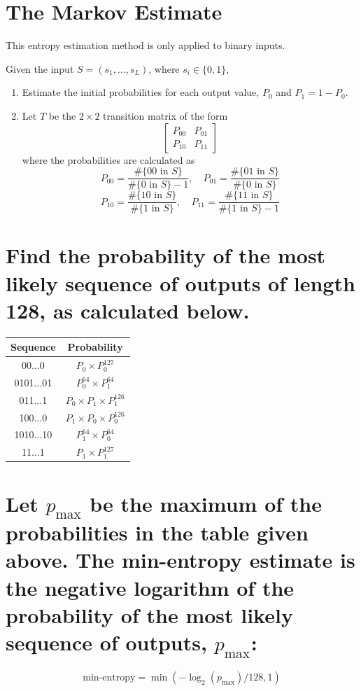 \documentclass[12pt,openany]{book}
\theoremstyle{definition}
\begin{document}
\section*{The Markov Estimate}

This entropy estimation method is only applied to binary inputs.

Given the input \(S = (s_1, \ldots, s_L)\), where \(s_i \in \{0,1\}\),
\begin{enumerate}
	\item Estimate the initial probabilities for each output value, \(P_0\) and \(P_1 = 1 - P_0\).
	\item Let \(T\) be the \(2\times2\) transition matrix of the form
	\[\begin{bmatrix}
		P_{00} & P_{01} \\
		P_{10} & P_{11}
	\end{bmatrix}\]
	where the probabilities are calculated as
	\[P_{00} = \frac{\#\{00 \text{ in } S\}}{\#\{0 \text{ in } S\} - 1}, \quad P_{01} = \frac{\#\{01 \text{ in } S\}}{\#\{0 \text{ in } S\}}\]
	\[P_{10} = \frac{\#\{10 \text{ in } S\}}{\#\{1 \text{ in } S\}}, \quad P_{11} = \frac{\#\{11 \text{ in } S\}}{\#\{1 \text{ in } S\} - 1}\]
\end{enumerate}

\section*{Find the probability of the most likely sequence of outputs of length 128, as calculated below.}
\begin{center}
	\begin{tabular}{cc}
		\toprule
		Sequence & Probability \\
		\midrule
		00...0 & \( P_0 \times P_0^{127} \) \\
		0101...01 & \( P_0^{64} \times P_1^{64} \) \\
		011...1 & \( P_0 \times P_1 \times P_1^{126} \) \\
		100...0 & \( P_1 \times P_0 \times P_0^{126} \) \\
		1010...10 & \( P_1^{64} \times P_0^{64} \) \\
		11...1 & \( P_1 \times P_1^{127} \) \\
		\bottomrule
	\end{tabular}
\end{center}

\section*{Let \(p_{\max}\) be the maximum of the probabilities in the table given above. The min-entropy estimate is the negative logarithm of the probability of the most likely sequence of outputs, \(p_{\max}\):}
\[ \text{min-entropy} = \min(-\log_2(p_{\max})/128,1) \]
\end{document}
